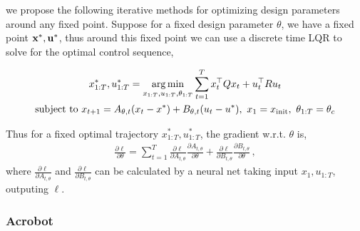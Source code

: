 \documentclass{article}
\begin{document}
we propose the following iterative methods for optimizing design parameters around any fixed point. Suppose for a fixed design parameter $\theta$, we have a fixed point $\mathbf{x}^*, \mathbf{u}^*$, thus around this fixed point we can use a discrete time LQR to solve for the optimal control sequence,

\begin{gather*}
    x_{1:T}^*, u_{1:T}^*= \operatorname*{arg\,min}\limits_{x_{1:T},u_{1:T},\theta_{1:T}} \sum\limits_{t=1}^{T} x_t^\top Q x_t + u_t^\top R u_t \\
    \text{subject to~} x_{t+1} = A_{\theta,t}(x_t - x^*) + B_{\theta,t}(u_t-u^*) ,~x_1 = x_{\text{init}},~\theta_{1:T} = \theta_c
\end{gather*}


Thus for a fixed optimal trajectory $x_{1:T}^*, u_{1:T}^*$, the gradient w.r.t. $\theta$ is,
\begin{align*}
\frac{\partial \ell}{\partial \theta} = \sum\limits_{t=1}^{T} \frac{\partial \ell}{\partial A_{t,\theta}} \frac{\partial A_{t,\theta}}{\partial \theta}  + \frac{\partial \ell}{\partial B_{t,\theta}} \frac{\partial B_{t,\theta}}{\partial \theta}\,, 
\end{align*}
where $ \frac{\partial \ell}{\partial A_{t,\theta}}$ and $\frac{\partial \ell}{\partial B_{t,\theta}} $ can be calculated by a neural net taking input $x_1, u_{1:T}$, outputing $\ell$.




\subsubsection{Acrobot}
\end{document}
